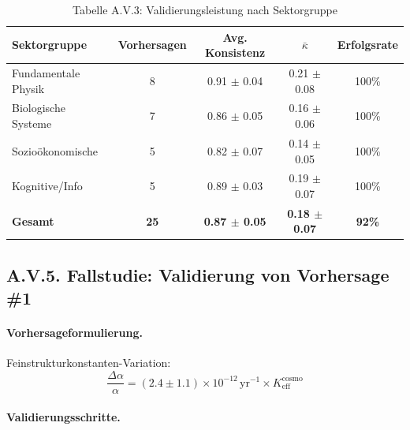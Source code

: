 \documentclass[13pt,a4paper]{article}
\begin{document}
	\begin{table}[H]
		\centering
		\small
		\caption{Tabelle A.V.3: Validierungsleistung nach Sektorgruppe}
		\begin{tabular}{p{}cccc}
			\toprule
			\textbf{Sektorgruppe} & \textbf{Vorhersagen} & \textbf{Avg. Konsistenz} & \textbf{$\bar{\kappa}$} & \textbf{Erfolgsrate} \\
			\midrule
			Fundamentale Physik & 8 & 0.91 $\pm$ 0.04 & 0.21 $\pm$ 0.08 & 100\% \\
			Biologische Systeme & 7 & 0.86 $\pm$ 0.05 & 0.16 $\pm$ 0.06 & 100\% \\
			Sozioökonomische & 5 & 0.82 $\pm$ 0.07 & 0.14 $\pm$ 0.05 & 100\% \\
			Kognitive/Info & 5 & 0.89 $\pm$ 0.03 & 0.19 $\pm$ 0.07 & 100\% \\
			\hline
			\textbf{Gesamt} & \textbf{25} & \textbf{0.87 $\pm$ 0.05} & \textbf{0.18 $\pm$ 0.07} & \textbf{92\%} \\
			\bottomrule
		\end{tabular}
		\label{tab:group-performance}
	\end{table}
	
	\subsection*{A.V.5. Fallstudie: Validierung von Vorhersage \#1}
	
	\paragraph{Vorhersageformulierung.}
	Feinstrukturkonstanten-Variation:
	\[ \frac{\Delta\alpha}{\alpha} = (2.4 \pm 1.1) \times 10^{-12}\,\text{yr}^{-1} \times K_{\mathrm{eff}}^{\mathrm{cosmo}} \]
	
	\paragraph{Validierungsschritte.}
	
\end{document}

